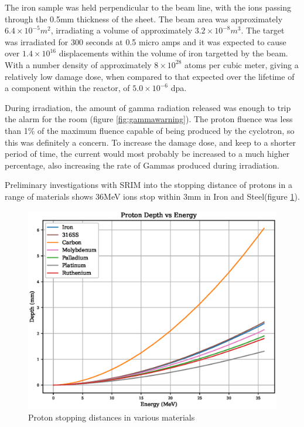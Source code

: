 The iron sample was held perpendicular to the beam line, with the ions passing through the 0.5mm thickness of the sheet.  The beam area was approximately $6.4 \times 10^{-5} m^2$, irradiating a volume of approximately $3.2 \times 10^{-8} m^3$.  The target was irradiated for 300 seconds at 0.5 micro amps and it was expected to cause over $1.4 \times 10^{16}$ displacements within the volume of iron targetted by the beam.  With a number density of approximately $8\times10^{28}$ atoms per cubic meter, giving a relatively low damage dose, when compared to that expected over the lifetime of a component within the reactor, of $5.0 \times 10^{-6}$ \acrshort{dpa}.

During irradiation, the amount of gamma radiation released was enough to trip the alarm for the room (figure \ref{fig:gammawarning}).  The proton fluence was less than 1\% of the maximum fluence capable of being produced by the cyclotron, so this was definitely a concern.  To increase the damage dose, and keep to a shorter period of time, the current would most probably be increased to a much higher percentage, also increasing the rate of Gammas produced during irradiation.

Preliminary investigations with SRIM into the stopping distance of protons in a range of materials shows 36MeV ions stop within 3mm in Iron and Steel(figure \ref{fig:stoppingdistanceprotons}).

\FloatBarrier
\begin{figure}[h]
  \begin{center}
    \includegraphics[width=0.7\linewidth]{chapters/activity_code/proton_stopping.eps}
    \caption{Proton stopping distances in various materials}
    \label{fig:stoppingdistanceprotons}
  \end{center}
\end{figure}

